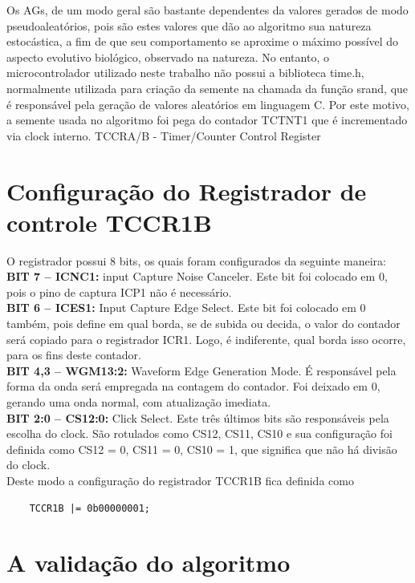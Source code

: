 \documentclass[
    12pt,               %
    oneside,%
    a4paper,            %
    english,            %
    french,             %
    spanish,            %
    brazil,             %
    ]{abntex2}
\begin{document}
  Os AGs, de um modo geral são bastante dependentes da valores gerados de modo pseudoaleatórios, pois são estes valores que dão ao algoritmo sua natureza estocástica, a fim de que seu comportamento se aproxime o máximo possível do aspecto evolutivo biológico, observado na natureza. No entanto, o microcontrolador utilizado neste trabalho não possui a biblioteca time.h, normalmente utilizada para criação da semente na chamada da função srand, que é responsável pela geração de valores aleatórios em linguagem C. Por este motivo, a semente usada no algoritmo foi pega do contador TCTNT1  que é incrementado via clock interno. 
  TCCRA/B -  Timer/Counter Control Register

\section{Configuração do Registrador de controle TCCR1B}

  O registrador possui 8 bits, os quais foram configurados da seguinte maneira:\\
  \textbf{BIT 7 – ICNC1:}  input Capture Noise Canceler. Este bit foi colocado em 0, pois o pino de captura ICP1 não é necessário.\\
  \textbf{BIT 6 – ICES1:} Input Capture Edge Select. Este bit foi colocado em 0 também, pois define em qual borda, se de subida ou decida, o valor do contador será copiado para o registrador ICR1. Logo, é indiferente, qual borda isso ocorre, para os fins deste contador.\\
  \textbf{BIT 4,3 – WGM13:2:} Waveform Edge Generation Mode. É responsável pela forma da onda será empregada na contagem do contador. Foi deixado em 0, gerando uma onda normal, com atualização imediata.\\
  \textbf{BIT 2:0 – CS12:0:} Click Select. Este três últimos bits são responsáveis pela escolha do clock. São rotulados como CS12, CS11, CS10 e sua configuração foi definida como CS12 = 0, CS11 = 0, CS10 = 1, que significa que não há divisão do clock. \\


  Deste modo a configuração do registrador TCCR1B fica definida como 

  \begin{verbatim}
    TCCR1B |= 0b00000001;
  \end{verbatim}

\section{A validação do algoritmo}
\end{document}
